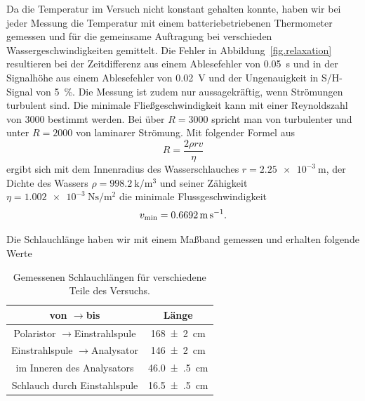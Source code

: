 \documentclass[paper=a4,
	fontsize=10pt,
	DIV=18,
	twocolumn,
	parskip=half
	]{scrartcl}
\numberwithin{equation}{section}    %
\newcommand{\tra}{$\rightarrow $}
\begin{document}
Da die Temperatur im Versuch nicht konstant gehalten konnte, haben wir bei jeder Messung die Temperatur mit einem batteriebetriebenen Thermometer gemessen und für die gemeinsame Auftragung bei verschieden Wassergeschwindigkeiten gemittelt. Die Fehler in Abbildung~\ref{fig.relaxation} resultieren bei der Zeitdifferenz aus einem Ablesefehler von \SI{0.05}{\second} und in der Signalhöhe aus einem Ablesefehler von \SI{0.02}{\volt} und der Ungenauigkeit in S/H-Signal von \SI{5}{\percent}.
Die Messung ist zudem nur aussagekräftig, wenn Strömungen turbulent sind. Die minimale Fließgeschwindigkeit kann mit einer Reynoldszahl von 3000 bestimmt werden. Bei über $R = 3000$ spricht man von turbulenter und unter $R=2000$ von laminarer Strömung. Mit folgender Formel aus~\citet{anleitung}
\begin{equation}
	R=\frac{2\rho rv}{\eta}
\end{equation}
ergibt sich mit dem Innenradius des Wasserschlauches $r=\SI{2.25e-3}{\meter}$, der Dichte des Wassers $\rho=\SI{998.2}{\kilo\per\meter^3}$ und seiner Zähigkeit $\eta = \SI{1.002e-3}{\newton\second\per\meter\squared}$ die minimale Flussgeschwindigkeit
\begin{equation}
	v_{\rm min} = \SI{0.6692}{\meter\per\second}.
	\label{eq.vmin}
\end{equation}

Die Schlauchlänge haben wir mit einem Maßband gemessen und erhalten folgende Werte

\begin{table}[htp]
	\begin{center}
	\begin{tabular}{cc}
		\hline
		von \tra bis & Länge \\
		\hline
		Polaristor \tra Einstrahlspule & \SI{168(2)}{\centi\meter}\\
		Einstrahlspule \tra Analysator & \SI{146(2)}{\centi\meter}\\
		im Inneren des Analysators & \SI{46.0(5)}{\centi\meter}\\
		Schlauch durch Einstahlspule & \SI{16.5(5)}{\centi\meter}\\
		\hline
	\end{tabular}
	\caption{Gemessenen Schlauchlängen für verschiedene Teile des Versuchs.}
	\label{tab.schlauch}
	\end{center}
\end{table}
\end{document}
